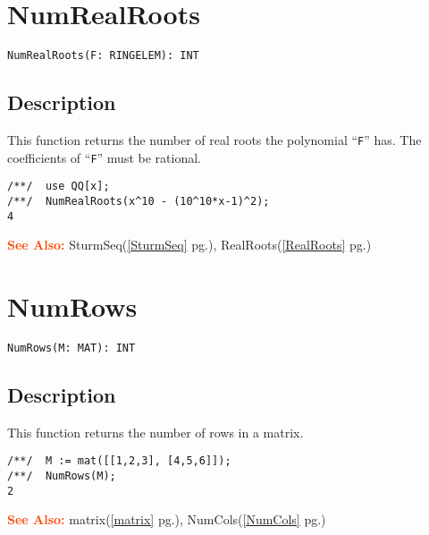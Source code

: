\documentclass[a4paper]{mybook}
\newenvironment{command}{}{} %
\newcommand\SeeAlso{\par\textcolor{OrangeRed}{\textbf{\large See Also: }}}
\begin{document}
\section{NumRealRoots}
\label{NumRealRoots}
\begin{command} %


\begin{Verbatim}[label=syntax, rulecolor=\color{MidnightBlue},
frame=single]
NumRealRoots(F: RINGELEM): INT
\end{Verbatim}


\subsection*{Description}

This function returns the number of real roots the polynomial ``\verb&F&'' has.
The coefficients of ``\verb&F&'' must be rational.
\begin{Verbatim}[label=example, rulecolor=\color{PineGreen}, frame=single]
/**/  use QQ[x];
/**/  NumRealRoots(x^10 - (10^10*x-1)^2);
4
\end{Verbatim}


\SeeAlso %
  SturmSeq(\ref{SturmSeq} pg.\pageref{SturmSeq}), 
    RealRoots(\ref{RealRoots} pg.\pageref{RealRoots})
\end{command} %

\section{NumRows}
\label{NumRows}
\begin{command} %


\begin{Verbatim}[label=syntax, rulecolor=\color{MidnightBlue},
frame=single]
NumRows(M: MAT): INT
\end{Verbatim}


\subsection*{Description}

This function returns the number of rows in a matrix.
\begin{Verbatim}[label=example, rulecolor=\color{PineGreen}, frame=single]
/**/  M := mat([[1,2,3], [4,5,6]]);
/**/  NumRows(M);
2
\end{Verbatim}


\SeeAlso %
  matrix(\ref{matrix} pg.\pageref{matrix}), 
    NumCols(\ref{NumCols} pg.\pageref{NumCols})
\end{command} %
\end{document}
